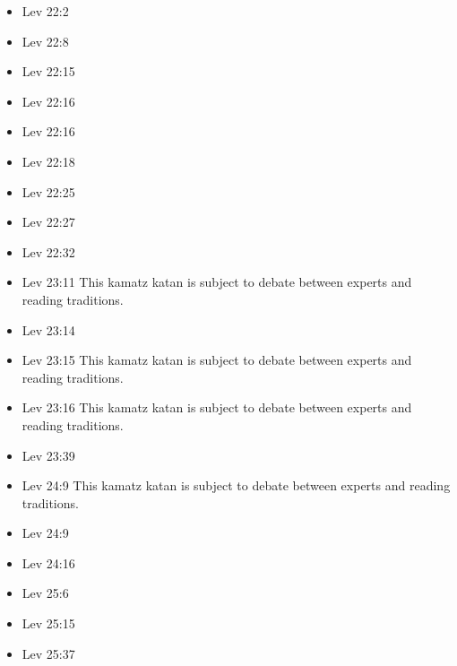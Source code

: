 \documentclass[14pt]{article}
\begin{document}
\begin{multicols}{2}
\begin{itemize}
\item Lev 22:2

\item Lev 22:8

\item Lev 22:15

\item Lev 22:16

\item Lev 22:16

\item Lev 22:18

\item Lev 22:25

\item Lev 22:27

\item Lev 22:32

\item Lev 23:11 This kamatz katan is subject to debate between experts and reading traditions.

\item Lev 23:14

\item Lev 23:15 This kamatz katan is subject to debate between experts and reading traditions.

\item Lev 23:16 This kamatz katan is subject to debate between experts and reading traditions.

\item Lev 23:39

\item Lev 24:9 This kamatz katan is subject to debate between experts and reading traditions.

\item Lev 24:9

\item Lev 24:16

\item Lev 25:6

\item Lev 25:15

\item Lev 25:37


\end{itemize}
\end{multicols}
\end{document}
